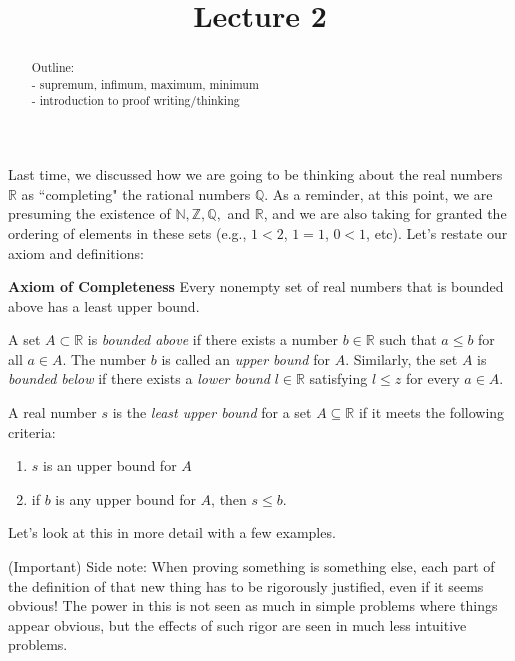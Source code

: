 \documentclass{ximera}
\begin{document}
    \title{Lecture 2}
    
    \begin{abstract}  
    Outline: \\
    - supremum, infimum, maximum, minimum \\
    - introduction to proof writing/thinking 
\end{abstract}

\maketitle

Last time, we discussed how we are going to be thinking about the real numbers $\mathbb{R}$ as ``completing" the rational numbers $\mathbb{Q}$.  As a reminder, at this point, we are presuming the existence of $\mathbb{N}, \mathbb{Z}, \mathbb{Q},$ and $\mathbb{R}$, and we are also taking for granted the ordering of elements in these sets (e.g., $1 < 2$, $1 = 1$, $0 < 1$, etc).  Let's restate our axiom and definitions:

\textbf{Axiom of Completeness} Every nonempty set of real numbers that is bounded above has a least upper bound.

\begin{definition}
    A set $A \subset \mathbb{R}$ is \textit{bounded above} if there exists a number $b \in \mathbb{R}$ such that $a \leq b$ for all $a \in A$.  The number $b$ is called an \textit{upper bound} for $A$.  Similarly, the set $A$ is \textit{bounded below} if there exists a \textit{lower bound} $l \in \mathbb{R}$ satisfying $l \leq z$ for every $a \in A$.
\end{definition}

\begin{definition}\label{def:supremum}
    A real number $s$ is the \textit{least upper bound} for a set $A \subseteq \mathbb{R}$ if it meets the following criteria:
    \begin{enumerate}
        \item $s$ is an upper bound for $A$
        \item if $b$ is any upper bound for $A$, then $s \leq b$.
    \end{enumerate}
\end{definition}

Let's look at this in more detail with a few examples.

(Important) Side note: When proving something is something else, each part of the definition of that new thing has to be rigorously justified, even if it seems obvious!  The power in this is not seen as much in simple problems where things appear obvious, but the effects of such rigor are seen in much less intuitive problems.
\end{document}
